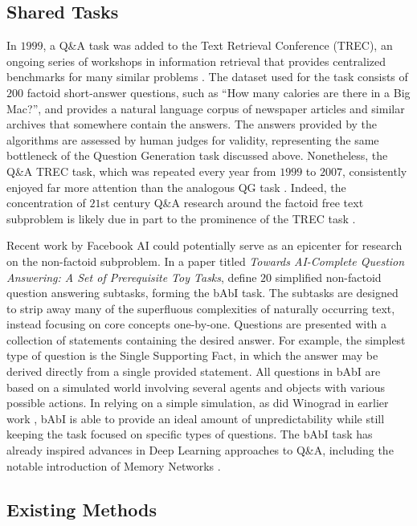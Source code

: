 \subsection{Shared Tasks}

In $1999$, a Q\&A task was added to the Text Retrieval Conference (TREC), an ongoing series of workshops in information retrieval that provides centralized benchmarks for many similar problems \citep{voorhees1999trec}. The dataset used for the task consists of $200$ factoid short-answer questions, such as ``How many calories are there in a Big Mac?'', and provides a natural language corpus of newspaper articles and similar archives that somewhere contain the answers. The answers provided by the algorithms are assessed by human judges for validity, representing the same bottleneck of the Question Generation task discussed above. Nonetheless, the Q\&A TREC task, which was repeated every year from $1999$ to $2007$, consistently enjoyed far more attention than the analogous QG task \citep{dang2007overview}. Indeed, the concentration of $21$st century Q\&A research around the factoid free text subproblem is likely due in part to the prominence of the TREC task \citep{hirschman2001natural}.

Recent work by Facebook AI could potentially serve as an epicenter for research on the non-factoid subproblem. In a paper titled \textit{Towards AI-Complete Question Answering: A Set of Prerequisite Toy Tasks}, \citet{weston2015towards} define $20$ simplified non-factoid question answering subtasks, forming the bAbI task. The subtasks are designed to strip away many of the superfluous complexities of naturally occurring text, instead focusing on core concepts one-by-one. Questions are presented with a collection of statements containing the desired answer. For example, the simplest type of question is the Single Supporting Fact, in which the answer may be derived directly from a single provided statement. All questions in bAbI are based on a simulated world involving several agents and objects with various possible actions. In relying on a simple simulation, as did Winograd in earlier work \citep{winograd1971procedures}, bAbI is able to provide an ideal amount of unpredictability while still keeping the task focused on specific types of questions. The bAbI task has already inspired advances in Deep Learning approaches to Q\&A, including the notable introduction of Memory Networks \citep{sukhbaatar2015weakly}.

\subsection{Existing Methods}

